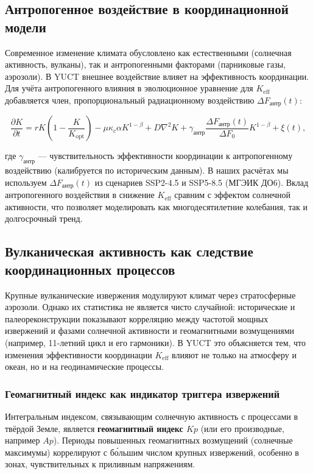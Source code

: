 \documentclass[12pt,a4paper]{article}
\newcommand{\Keff}{K_{\mathrm{eff}}}
\begin{document}
	\subsection{Антропогенное воздействие в координационной модели}
	
	Современное изменение климата обусловлено как естественными (солнечная активность, вулканы), так и антропогенными факторами (парниковые газы, аэрозоли). В YUCT внешнее воздействие влияет на эффективность координации. Для учёта антропогенного влияния в эволюционное уравнение для \(K_{\mathrm{eff}}\) добавляется член, пропорциональный радиационному воздействию \(\Delta F_{\mathrm{антр}}(t)\):
	
	\[
	\frac{\partial K}{\partial t} = r K \left(1 - \frac{K}{K_{\mathrm{opt}}}\right) - \mu \kappa_c \alpha K^{1-\beta} 
	+ D\nabla^2 K + \gamma_{\mathrm{антр}} \frac{\Delta F_{\mathrm{антр}}(t)}{\Delta F_0} K^{1-\beta} + \xi(t),
	\]
	
	где \(\gamma_{\mathrm{антр}}\) — чувствительность эффективности координации к антропогенному воздействию (калибруется по историческим данным). В наших расчётах мы используем \(\Delta F_{\mathrm{антр}}(t)\) из сценариев SSP2-4.5 и SSP5-8.5 (МГЭИК ДО6). Вклад антропогенного воздействия в снижение \(K_{\mathrm{eff}}\) сравним с эффектом солнечной активности, что позволяет моделировать как многодесятилетние колебания, так и долгосрочный тренд.
	
	\subsection{Вулканическая активность как следствие координационных процессов}
	
	Крупные вулканические извержения модулируют климат через стратосферные аэрозоли. Однако их статистика не является чисто случайной: исторические и палеореконструкции показывают корреляцию между частотой мощных извержений и фазами солнечной активности и геомагнитными возмущениями (например, 11-летний цикл и его гармоники). В YUCT это объясняется тем, что изменения эффективности координации \(\Keff\) влияют не только на атмосферу и океан, но и на геодинамические процессы.
	
	\subsubsection{Геомагнитный индекс как индикатор триггера извержений}
	
	Интегральным индексом, связывающим солнечную активность с процессами в твёрдой Земле, является \textbf{геомагнитный индекс \(Kp\)} (или его производные, например \(Ap\)). Периоды повышенных геомагнитных возмущений (солнечные максимумы) коррелируют с бо́льшим числом крупных извержений, особенно в зонах, чувствительных к приливным напряжениям.
	
\end{document}
